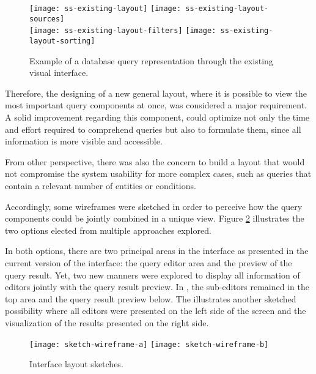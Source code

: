 \begin{figure}[tb]
    \centering
      {\texttt{[image: ss-existing-layout]}}%
      {\texttt{[image: ss-existing-layout-sources]}}%
      \\
    {\texttt{[image: ss-existing-layout-filters]}}%
    {\texttt{[image: ss-existing-layout-sorting]}}%
  \caption{Example of a database query representation through the existing visual interface.}
    \label{fig:example_of_query_representation}
\end{figure}

Therefore, the designing of a new general layout, where it is possible to view the most important query components at once, was considered a major requirement. A solid improvement regarding this component, could optimize not only the time and effort required to comprehend queries but also to formulate them, since all information is more visible and accessible.

From other perspective, there was also the concern to build a layout that would not compromise the system usability for more complex cases, such as queries that contain a relevant number of entities or conditions.

Accordingly, some wireframes were sketched in order to perceive how the query components could be jointly combined in a unique view. Figure \ref{fig:sketch_wireframes} illustrates the two options elected from multiple approaches explored.

In both options, there are two principal areas in the interface as presented in the current version of the interface: the query editor area and the preview of the query result. Yet, two new manners were explored to display all information of editors jointly with the query result preview. In , the sub-editors remained in the top area and the query result preview below. The  illustrates another sketched possibility where all editors were presented on the left side of the screen and the visualization of the results presented on the right side.

\begin{figure}[tb]
  \centering
    {\texttt{[image: sketch-wireframe-a]}}%
  {\texttt{[image: sketch-wireframe-b]}}%
\caption{Interface layout sketches.}
  \label{fig:sketch_wireframes}
\end{figure}

